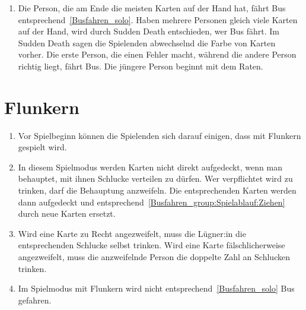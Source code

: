 \begin{enumerate}[label={(\arabic*)}]
    \item
    Die Person, die am Ende die meisten Karten auf der Hand hat, fährt Bus entsprechend~\cref{Busfahren_solo}.
    Haben mehrere Personen gleich viele Karten auf der Hand, wird durch Sudden Death entschieden, wer Bus fährt.
    Im Sudden Death sagen die Spielenden abwechselnd die Farbe von Karten vorher.
    Die erste Person, die einen Fehler macht, während die andere Person richtig liegt, fährt Bus.
    Die jüngere Person beginnt mit dem Raten.
\end{enumerate}

\section{Flunkern}
\begin{enumerate}[label={(\arabic*)}]
\item
Vor Spielbeginn können die Spielenden sich darauf einigen, dass mit Flunkern gespielt wird.

\item
In diesem Spielmodus werden Karten nicht direkt aufgedeckt, wenn man behauptet, mit ihnen Schlucke verteilen zu dürfen.
Wer verpflichtet wird zu trinken, darf die Behauptung anzweifeln.
Die entsprechenden Karten werden dann aufgedeckt und entsprechend~\ref{Busfahren_group:Spielablauf:Ziehen} durch neue Karten ersetzt.

\item
Wird eine Karte zu Recht angezweifelt, muss die Lügner:in die entsprechenden Schlucke selbst trinken.
Wird eine Karte fälschlicherweise angezweifelt, muss die anzweifelnde Person die doppelte Zahl an Schlucken trinken.

\item
Im Spielmodus mit Flunkern wird nicht entsprechend~\cref{Busfahren_solo} Bus gefahren.
\end{enumerate}

